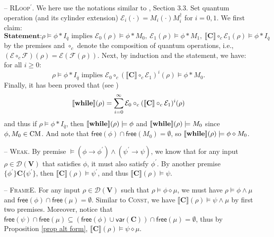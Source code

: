 \documentclass[conference,compsoc, 10pt]{IEEEtran}
\newcommand {\qbar} {{\overline{q}}}
\newcommand {\cD } {{\mathcal{D}}}
\newcommand {\cE } {{\mathcal{E}}}
\newcommand {\cF } {{\mathcal{F}}}
\newcommand {\id } {{I}}
\newcommand {\free }[1] {{\mathsf{free}\left(#1\right)}}
\newcommand {\vars } {\mathbf{V}}
\newcommand {\var } {\mathsf{var}}
\newcommand {\prog } {{\mathbf{C}}}
\newcommand {\sem}[1] {\llbracket#1\rrbracket}
\newcommand{\sd}{\diamond}%
\begin{document}
\begin{appendices}
		\noindent -- \textsc{RLoop$^\prime$}. We here use the notations similar to \cite{Ying16}, Section 3.3. Set quantum operation (and its cylinder extension) $\cE_i(\cdot) = M_i(\cdot) M_i^\dag$ for $i = 0,1$. We first claim:
		$$\textbf{Statement:} \rho\models\phi\ast\id_{\qbar} \text{\ implies\ } \cE_0(\rho)\models\phi\ast M_0,\ \cE_1(\rho)\models\phi\ast M_1, \ \sem{\prog}\circ_{c}\cE_1(\rho)\models\phi\ast I_{\qbar}$$
		by the premises and $\circ_{c}$ denote the composition of quantum operations, i.e., $(\cE\circ_{c}\cF)(\rho) = \cE(\cF(\rho))$.
		Next, by induction and the statement, we have: for all $i\ge 0$:
		$$ \rho\models\phi\ast\id_{\qbar} \text{\ implies\ } \cE_0\circ_{c}(\sem{\prog}\circ_{c}\cE_1)^i(\rho)\models\phi\ast M_0.$$
		Finally, it has been proved that (see \cite{Ying11})
		$$\sem{{\bf while}}(\rho) = \sum_{i=0}^\infty \cE_0\circ_{c}(\sem{\prog}\circ_{c}\cE_1)^i(\rho) $$
		and thus if $\rho\models\phi\ast\id_{\qbar}$, then $\sem{{\bf while}}(\rho)\models\phi$ and $\sem{{\bf while}}(\rho)\models M_0$ since $\phi,M_0\in{\rm CM}$. And note that $\free{\phi}\cap\free{M_0} = \emptyset$, so  $\sem{{\bf while}}(\rho)\models \phi\sd M_0$.	
		
		\vspace{0.4cm}
		
		\noindent -- \textsc{Weak}. By premise $\models (\phi\rightarrow\phi^\prime)\wedge(\psi^{\prime}\rightarrow\psi)$, we know that for any input $\rho\in\cD(\vars)$ that satisfies $\phi$, it must also satisfy $\phi^\prime$. By another premise $\{\phi^{\prime}\}\prog\{\psi^{\prime}\}$, then $\sem{\prog}(\rho)\models\psi^{\prime}$, and thus $\sem{\prog}(\rho)\models\psi$.
		
		\vspace{0.4cm}
		
		\noindent -- \textsc{FrameE}. For any input $\rho\in\cD(\vars)$ such that $\rho\models\phi\sd\mu$, we must have $\rho\models\phi\wedge\mu$ and $\free{\phi}\cap\free{\mu} = \emptyset$. Similar to \textsc{Const}, we have $\sem{\prog}(\rho)\models\psi\wedge\mu$ by first two premises. Moreover, notice that $\free{\psi}\cap\free{\mu} \subseteq (\free{\phi}\cup\var(\prog))\cap\free{\mu} = \emptyset$, thus by Proposition \ref{prop alt form}, $\sem{\prog}(\rho)\models\psi\sd\mu$.
		
		
	\end{appendices}
	
	
	
	
	
	
	
	
	
	
	
	
\end{document}
